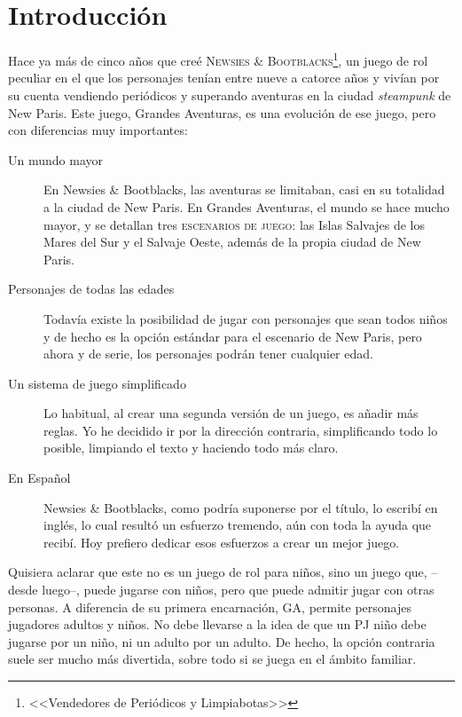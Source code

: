 \chapter{Introducción}

\varhrulefill


Hace ya más de cinco años que creé \textsc{Newsies \& Bootblacks}\footnote{<<Vendedores de Periódicos y Limpiabotas>>}, un juego de rol peculiar en el que los personajes tenían entre nueve a catorce años y vivían por su cuenta vendiendo periódicos y superando aventuras en la ciudad \emph{steampunk} de New Paris. Este juego, Grandes Aventuras, es una evolución de ese juego, pero con diferencias muy importantes:

\begin{description}
\item[Un mundo mayor] En Newsies \& Bootblacks, las aventuras se limitaban, casi en su totalidad a la ciudad de New Paris. En Grandes Aventuras, el mundo se hace mucho mayor, y se detallan tres \textsc{escenarios de juego}: las Islas Salvajes de los Mares del Sur y el Salvaje Oeste, además de la propia ciudad de New Paris.
\item[Personajes de todas las edades] Todavía existe la posibilidad de jugar con personajes que sean todos niños y de hecho es la opción estándar para el escenario de New Paris, pero ahora y de serie, los personajes podrán tener cualquier edad.
\item[Un sistema de juego simplificado] Lo habitual, al crear una segunda versión de un juego, es añadir más reglas. Yo he decidido ir por la dirección contraria, simplificando todo lo posible, limpiando el texto y haciendo todo más claro. 
\item[En Español] Newsies \& Bootblacks, como podría suponerse por el título, lo escribí en inglés, lo cual resultó un esfuerzo tremendo, aún con toda la ayuda que recibí. Hoy prefiero dedicar esos esfuerzos a crear un mejor juego.
\end{description}

Quisiera aclarar que este no es un juego de rol para niños, sino un juego que, --desde luego--, puede jugarse con niños, pero que puede admitir jugar con otras personas. A diferencia de su primera encarnación, GA, permite personajes jugadores adultos y niños. No debe llevarse a la idea de que un PJ niño debe jugarse por un niño, ni un adulto por un adulto. De hecho, la opción contraria suele ser mucho más divertida, sobre todo si se juega en el ámbito familiar.

